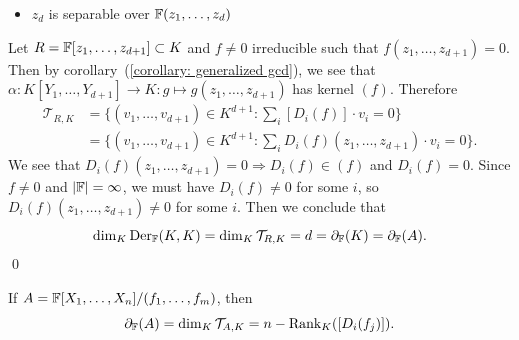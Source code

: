 \begin{itemize}
\begin{itemize}
    \item $z_d$ is separable over $\mathbb{F}(z_1,\dots, z_d)$
  \end{itemize}
  Let $R = \mathbb{F}[z_1,\dots, z_{d+1}]\subset K$ and $f\neq0$ irreducible such that 
  $f(z_1,\dots, z_{d+1})=0$. Then by corollary~(\ref{corollary: generalized gcd}), we see that 
  $\alpha:K[Y_1,\dots,Y_{d+1}]\to K:g\mapsto g(z_1,\dots, z_{d+1})$ has kernel $(f)$. 
  Therefore 
  \begin{equation}
    \begin{split}
        \mathcal{T}_{R,K} &= \{(v_1,\dots,v_{d+1})\in K^{d+1}:\sum_i[D_i(f)]\cdot v_i=0\}\\
        &=\{(v_1,\dots,v_{d+1})\in K^{d+1}: \sum_i D_i(f)(z_1,\dots, z_{d+1})\cdot v_i=0\}.
    \end{split}
  \end{equation}
  We see that $D_i(f)(z_1,\dots,z_{d+1})=0\Rightarrow D_i(f)\in (f)$ and $D_i(f)=0$. Since 
  $f\neq0$ and $|\mathbb{F}|=\infty$, we must have $D_i(f)\neq0$ for some $i$, so $D_i(f)(z_1,\dots, z_{d+1})\neq0$
  for some $i$. Then we conclude that 
  \begin{equation}
   \dim_K\text{Der}_{\mathbb{F}}(K,K)= \dim_{K} \mathcal{T}_{R,K} = d = \partial_{\mathbb{F}}(K) = \partial_{\mathbb{F}}(A).
  \end{equation}
  \qed
  \begin{corollary}
    If $A=\mathbb{F}[X_1,\dots,X_n]/(f_1,\dots,f_m)$, then  
    \begin{equation}
        \partial_{\mathbb{F}}(A) = \dim_K\mathcal{T}_{A,K}=n-\text{Rank}_K([D_i(f_j)]).
    \end{equation}
  \end{corollary} 


\end{itemize}
